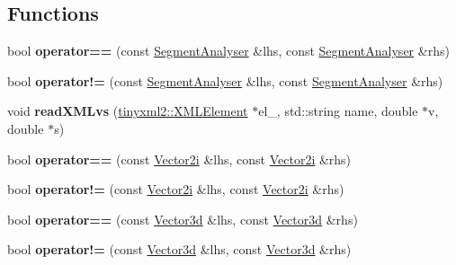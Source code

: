\subsection*{Functions}
\begin{DoxyCompactItemize}
\item 
\mbox{\label{namespaceCPlantBox_a916ca2dc6e81199a7f3eaa1e66832963}} 
bool {\bfseries operator==} (const \hyperlink{classCPlantBox_1_1SegmentAnalyser}{Segment\+Analyser} \&lhs, const \hyperlink{classCPlantBox_1_1SegmentAnalyser}{Segment\+Analyser} \&rhs)
\item 
\mbox{\label{namespaceCPlantBox_a1985d870984c84f6fd719202fa774b33}} 
bool {\bfseries operator!=} (const \hyperlink{classCPlantBox_1_1SegmentAnalyser}{Segment\+Analyser} \&lhs, const \hyperlink{classCPlantBox_1_1SegmentAnalyser}{Segment\+Analyser} \&rhs)
\item 
\mbox{\label{namespaceCPlantBox_a9464482d89ff25f411dd0b2e6476f759}} 
void {\bfseries read\+X\+M\+Lvs} (\hyperlink{classCPlantBox_1_1tinyxml2_1_1XMLElement}{tinyxml2\+::\+X\+M\+L\+Element} $\ast$el\+\_\+, std\+::string name, double $\ast$v, double $\ast$s)
\item 
\mbox{\label{namespaceCPlantBox_abd984fb114517b7d16acac0b2552b30a}} 
bool {\bfseries operator==} (const \hyperlink{classCPlantBox_1_1Vector2i}{Vector2i} \&lhs, const \hyperlink{classCPlantBox_1_1Vector2i}{Vector2i} \&rhs)
\item 
\mbox{\label{namespaceCPlantBox_a66c657c48f4beca49e13f9e2555d5787}} 
bool {\bfseries operator!=} (const \hyperlink{classCPlantBox_1_1Vector2i}{Vector2i} \&lhs, const \hyperlink{classCPlantBox_1_1Vector2i}{Vector2i} \&rhs)
\item 
\mbox{\label{namespaceCPlantBox_a8514331b3f3fe1aadc04cf2bebab60c6}} 
bool {\bfseries operator==} (const \hyperlink{classCPlantBox_1_1Vector3d}{Vector3d} \&lhs, const \hyperlink{classCPlantBox_1_1Vector3d}{Vector3d} \&rhs)
\item 
\mbox{\label{namespaceCPlantBox_afa95ee0c87f5f25887e706776be5dc5f}} 
bool {\bfseries operator!=} (const \hyperlink{classCPlantBox_1_1Vector3d}{Vector3d} \&lhs, const \hyperlink{classCPlantBox_1_1Vector3d}{Vector3d} \&rhs)

\end{DoxyCompactItemize}
